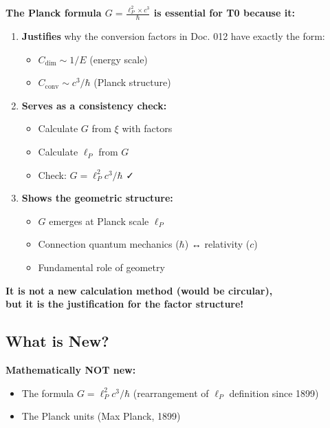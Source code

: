 	\begin{revolution}
		\textbf{The Planck formula $G = \frac{\ell_P^2 \times c^3}{\hbar}$ is essential for T0 because it:}
		
		\begin{enumerate}
			\item \textbf{Justifies} why the conversion factors in Doc. 012 have exactly the form:
			\begin{itemize}
				\item $C_{\text{dim}} \sim 1/E$ (energy scale)
				\item $C_{\text{conv}} \sim c^3/\hbar$ (Planck structure)
			\end{itemize}
			
			\item \textbf{Serves as a consistency check:}
			\begin{itemize}
				\item Calculate $G$ from $\xi$ with factors
				\item Calculate $\ell_P$ from $G$
				\item Check: $G = \ell_P^2 c^3/\hbar$ ✓
			\end{itemize}
			
			\item \textbf{Shows the geometric structure:}
			\begin{itemize}
				\item $G$ emerges at Planck scale $\ell_P$
				\item Connection quantum mechanics ($\hbar$) ↔ relativity ($c$)
				\item Fundamental role of geometry
			\end{itemize}
		\end{enumerate}
		
		\textbf{It is not a new calculation method (would be circular), \\
			but it is the justification for the factor structure!}
	\end{revolution}
	
	\subsection{What is New?}
	
	\textbf{Mathematically NOT new:}
	\begin{itemize}
		\item The formula $G = \ell_P^2 c^3/\hbar$ (rearrangement of $\ell_P$ definition since 1899)
		\item The Planck units (Max Planck, 1899)
	\end{itemize}
	
